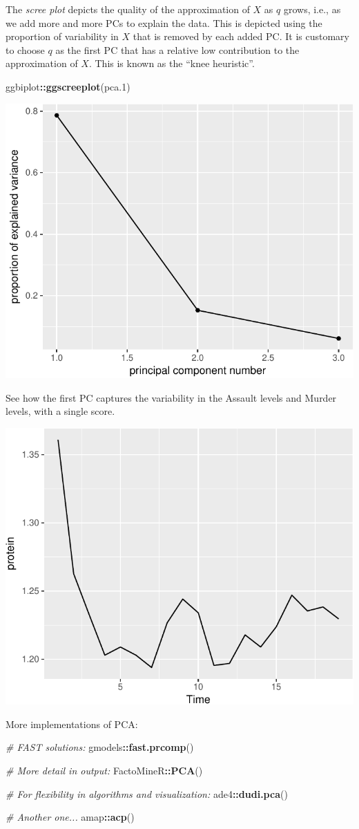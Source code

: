 \documentclass[]{book}
\newenvironment{Shaded}{\begin{snugshade}}{\end{snugshade}}
\newcommand{\KeywordTok}[1]{\textcolor[rgb]{0.13,0.29,0.53}{\textbf{#1}}}
\newcommand{\DecValTok}[1]{\textcolor[rgb]{0.00,0.00,0.81}{#1}}
\newcommand{\CommentTok}[1]{\textcolor[rgb]{0.56,0.35,0.01}{\textit{#1}}}
\newcommand{\OperatorTok}[1]{\textcolor[rgb]{0.81,0.36,0.00}{\textbf{#1}}}
\newcommand{\NormalTok}[1]{#1}
\theoremstyle{definition}
\theoremstyle{definition}
\theoremstyle{definition}
\theoremstyle{remark}
\begin{document}
The \emph{scree plot} depicts the quality of the approximation of \(X\)
as \(q\) grows, i.e., as we add more and more PCs to explain the data.
This is depicted using the proportion of variability in \(X\) that is
removed by each added PC. It is customary to choose \(q\) as the first
PC that has a relative low contribution to the approximation of \(X\).
This is known as the ``knee heuristic''.

\begin{Shaded}
\begin{Highlighting}[]
\NormalTok{ggbiplot}\OperatorTok{::}\KeywordTok{ggscreeplot}\NormalTok{(pca.}\DecValTok{1}\NormalTok{)}
\end{Highlighting}
\end{Shaded}

\includegraphics[width=0.5\linewidth]{Rcourse_files/figure-latex/scree-1}

See how the first PC captures the variability in the Assault levels and
Murder levels, with a single score.

\includegraphics[width=0.5\linewidth]{Rcourse_files/figure-latex/unnamed-chunk-253-1}

More implementations of PCA:

\begin{Shaded}
\begin{Highlighting}[]
\CommentTok{# FAST solutions:}
\NormalTok{gmodels}\OperatorTok{::}\KeywordTok{fast.prcomp}\NormalTok{()}

\CommentTok{# More detail in output:}
\NormalTok{FactoMineR}\OperatorTok{::}\KeywordTok{PCA}\NormalTok{()}

\CommentTok{# For flexibility in algorithms and visualization:}
\NormalTok{ade4}\OperatorTok{::}\KeywordTok{dudi.pca}\NormalTok{()}

\CommentTok{# Another one...}
\NormalTok{amap}\OperatorTok{::}\KeywordTok{acp}\NormalTok{()}
\end{Highlighting}
\end{Shaded}
\end{document}
